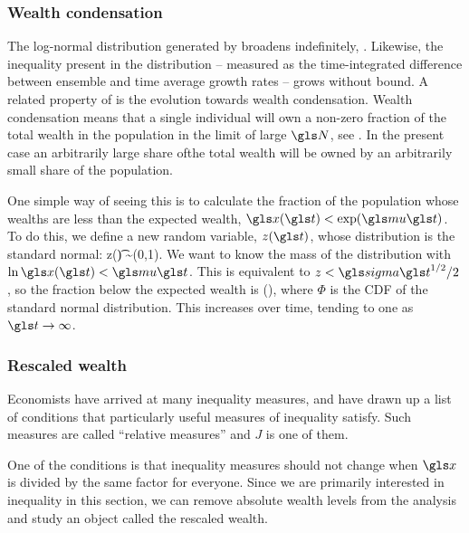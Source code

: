 
\subsubsection{Wealth condensation}
The log-normal distribution generated by \GBM broadens indefinitely, . Likewise, the inequality present in the distribution -- measured as the time-integrated difference between ensemble and time average growth rates -- grows without bound. A related property of \GBM is the evolution towards wealth condensation. Wealth condensation means that a single individual will own a non-zero fraction of the total wealth in the population in the limit of large $\N$, see \eg \cite{BouchaudMezard2000}. In the present case an arbitrarily large share ofthe  total wealth will be owned by an arbitrarily small share of the population.

One simple way of seeing this is to calculate the fraction of the population whose wealths are less than the expected wealth, \ie $\x(\t)<\exp(\gmu \t)$. To do this, we define a new random variable, $z(\t)$, whose distribution is the standard normal:
\be
z(\t) \equiv {} \sim \mathcal{\N}(0,1).
\ee
We want to know the mass of the distribution with $\ln \x(\t)<\gmu \t$. This is equivalent to $z<\gsigma \t^{1/2}/2$, so the fraction below the expected wealth is
\be
\Phi\left(\right),
\ee
where $\Phi$ is the CDF of the standard normal distribution. This increases over time, tending to one as $\t\to\infty$.


\subsubsection{Rescaled wealth}
Economists have arrived at many inequality measures, and have drawn up a list of conditions that particularly useful measures of inequality satisfy. Such measures are called ``relative measures'' \cite[Appendix 4]{Sen1997} and $J$ is one of them.

One of the conditions is that inequality measures should not change when $\x$ is divided by the same factor for everyone. Since we are primarily interested in inequality in this section, we can remove absolute wealth levels from the analysis and study an object called the rescaled wealth.

